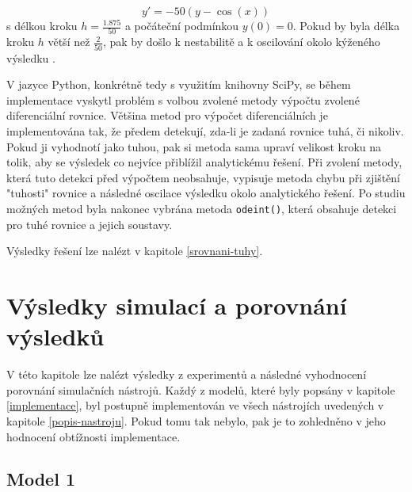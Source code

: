\begin{equation}
    y' = -50(y - \cos{(x)})
\end{equation}
s délkou kroku $h = \frac{1.875}{50}$ a počáteční podmínkou $y(0) = 0$. Pokud by byla délka kroku $h$ větší než $\frac{2}{50}$, pak by došlo k nestabilitě a k oscilování okolo kýženého výsledku \cite{hairer}.

V jazyce Python, konkrétně tedy s využitím knihovny SciPy, se během implementace vyskytl problém s volbou zvolené metody výpočtu zvolené diferenciální rovnice. Většina metod pro výpočet diferenciálních je implementována tak, že předem detekují, zda-li je zadaná rovnice tuhá, či nikoliv. Pokud ji vyhodnotí jako tuhou, pak si metoda sama upraví velikost kroku na tolik, aby se výsledek co nejvíce přiblížil analytickému řešení. Při zvolení metody, která tuto detekci před výpočtem neobsahuje, vypisuje metoda chybu při zjištění "tuhosti" rovnice a následné oscilace výsledku okolo analytického řešení. Po studiu možných metod byla nakonec vybrána metoda \texttt{odeint()}, která obsahuje detekci pro tuhé rovnice a jejich soustavy.



Výsledky řešení lze nalézt v kapitole \ref{srovnani-tuhy}.

\chapter{Výsledky simulací a porovnání výsledků}
\label{kapitola5}
V této kapitole lze nalézt výsledky z experimentů a následné vyhodnocení porovnání simulačních nástrojů. Každý z modelů, které byly popsány v kapitole \ref{implementace}, byl postupně implementován ve všech nástrojích uvedených v kapitole \ref{popis-nastroju}. Pokud tomu tak nebylo, pak je to zohledněno v jeho hodnocení obtížnosti implementace.

\section{Model 1}
\label{srovnani-micek}


